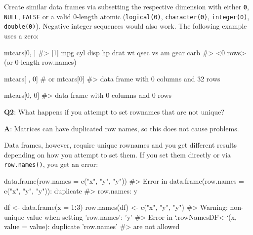 \documentclass[
]{krantz}
\makeatletter
\newenvironment{Shaded}{\begin{snugshade}}{\end{snugshade}}
\newcommand{\CommentTok}[1]{\textcolor[rgb]{0.56,0.35,0.01}{\textit{#1}}}
\newcommand{\DataTypeTok}[1]{\textcolor[rgb]{0.13,0.29,0.53}{#1}}
\newcommand{\DecValTok}[1]{\textcolor[rgb]{0.00,0.00,0.81}{#1}}
\newcommand{\KeywordTok}[1]{\textcolor[rgb]{0.13,0.29,0.53}{\textbf{#1}}}
\newcommand{\NormalTok}[1]{#1}
\newcommand{\OperatorTok}[1]{\textcolor[rgb]{0.81,0.36,0.00}{\textbf{#1}}}
\newcommand{\StringTok}[1]{\textcolor[rgb]{0.31,0.60,0.02}{#1}}
\newenvironment{kframe}{%
\medskip{}
\setlength{\fboxsep}{.8em}
 \def\at@end@of@kframe{}%
 \ifinner\ifhmode%
  \def\at@end@of@kframe{\end{minipage}}%
  \begin{minipage}{\columnwidth}%
 \fi\fi%
 \def\FrameCommand##1{\hskip\@totalleftmargin \hskip-\fboxsep
 \colorbox{shadecolor}{##1}\hskip-\fboxsep
     \hskip-\linewidth \hskip-\@totalleftmargin \hskip\columnwidth}%
 \MakeFramed {\advance\hsize-\width
   \@totalleftmargin\z@ \linewidth\hsize
   \@setminipage}}%
 {\par\unskip\endMakeFramed%
 \at@end@of@kframe}
\renewenvironment{Shaded}{\begin{kframe}}{\end{kframe}}
\renewcommand{\KeywordTok} [1]{\textcolor[rgb]{0.00,0.44,0.13}{{#1}}}
\renewcommand{\DataTypeTok}[1]{\textcolor[rgb]{0.56,0.13,0.00}{{#1}}}
\renewcommand{\DecValTok}  [1]{\textcolor[rgb]{0.25,0.63,0.44}{{#1}}}
\renewcommand{\StringTok}  [1]{\textcolor[rgb]{0.25,0.44,0.63}{{#1}}}
\renewcommand{\CommentTok} [1]{\textcolor[rgb]{0.38,0.63,0.69}{{#1}}}
\renewcommand{\NormalTok}  [1]{{#1}}
\makeatother
\begin{document}
Create similar data frames via subsetting the respective dimension with either \texttt{0}, \texttt{NULL}, \texttt{FALSE} or a valid 0-length atomic (\texttt{logical(0)}, \texttt{character(0)}, \texttt{integer(0)}, \texttt{double(0)}). Negative integer sequences would also work. The following example uses a zero:

\begin{Shaded}
\begin{Highlighting}[]
\NormalTok{mtcars[}\DecValTok{0}\NormalTok{, ]}
\CommentTok{#>  [1] mpg  cyl  disp hp   drat wt   qsec vs   am   gear carb}
\CommentTok{#> <0 rows> (or 0-length row.names)}

\NormalTok{mtcars[ , }\DecValTok{0}\NormalTok{]  }\CommentTok{# or mtcars[0]}
\CommentTok{#> data frame with 0 columns and 32 rows}

\NormalTok{mtcars[}\DecValTok{0}\NormalTok{, }\DecValTok{0}\NormalTok{]}
\CommentTok{#> data frame with 0 columns and 0 rows}
\end{Highlighting}
\end{Shaded}

\textbf{{Q2}}: What happens if you attempt to set rownames that are not unique?

\textbf{{A}}: Matrices can have duplicated row names, so this does not cause problems.

Data frames, however, require unique rownames and you get different results depending on how you attempt to set them. If you set them directly or via \texttt{row.names()}, you
get an error:

\begin{Shaded}
\begin{Highlighting}[]
\KeywordTok{data.frame}\NormalTok{(}\DataTypeTok{row.names =} \KeywordTok{c}\NormalTok{(}\StringTok{"x"}\NormalTok{, }\StringTok{"y"}\NormalTok{, }\StringTok{"y"}\NormalTok{))}
\CommentTok{#> Error in data.frame(row.names = c("x", "y", "y")): duplicate}
\CommentTok{#> row.names: y}

\NormalTok{df <-}\StringTok{ }\KeywordTok{data.frame}\NormalTok{(}\DataTypeTok{x =} \DecValTok{1}\OperatorTok{:}\DecValTok{3}\NormalTok{)}
\KeywordTok{row.names}\NormalTok{(df) <-}\StringTok{ }\KeywordTok{c}\NormalTok{(}\StringTok{"x"}\NormalTok{, }\StringTok{"y"}\NormalTok{, }\StringTok{"y"}\NormalTok{)}
\CommentTok{#> Warning: non-unique value when setting 'row.names': 'y'}
\CommentTok{#> Error in `.rowNamesDF<-`(x, value = value): duplicate 'row.names'}
\CommentTok{#> are not allowed}
\end{Highlighting}
\end{Shaded}
\end{document}
